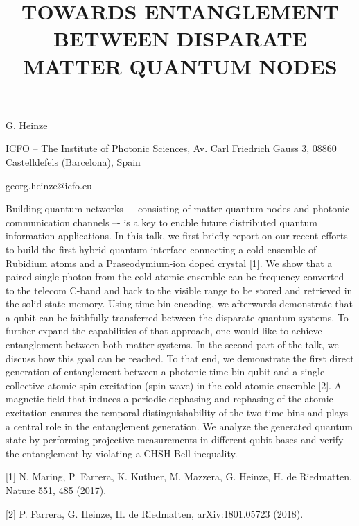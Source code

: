 \title{TOWARDS ENTANGLEMENT BETWEEN DISPARATE MATTER QUANTUM NODES}

\underline{G. Heinze} 

{\normalsize{\vspace{-4mm}
ICFO -- The Institute of Photonic Sciences, Av. Carl Friedrich Gauss 3, 08860 Castelldefels (Barcelona), Spain



\email georg.heinze@icfo.eu}}

Building quantum networks –- consisting of matter quantum nodes and photonic communication channels –- is a key to enable future distributed quantum information applications.
In this talk, we first briefly report on our recent efforts to build the first hybrid quantum interface connecting a cold ensemble of Rubidium atoms and a Praseodymium-ion doped crystal [1]. We show that a paired single photon from the cold atomic ensemble can be frequency converted to the telecom C-band and back to the visible range to be stored and retrieved in the solid-state memory. Using time-bin encoding, we afterwards demonstrate that a qubit can be faithfully transferred between the disparate quantum systems.
To further expand the capabilities of that approach, one would like to achieve entanglement between both matter systems. In the second part of the talk, we discuss how this goal can be reached. To that end, we demonstrate the first direct generation of entanglement between a photonic time-bin qubit and a single collective atomic spin excitation (spin wave) in the cold atomic ensemble [2]. A magnetic field that induces a periodic dephasing and rephasing of the atomic excitation ensures the temporal distinguishability of the two time bins and plays a central role in the entanglement generation. We analyze the generated quantum state by performing projective measurements in different qubit bases and verify the entanglement by violating a CHSH Bell inequality.

{\normalsize
[1] N. Maring, P. Farrera, K. Kutluer, M. Mazzera, G. Heinze, H. de Riedmatten, Nature 551, 485 (2017).
\vsp

[2] P. Farrera, G. Heinze, H. de Riedmatten, arXiv:1801.05723 (2018).
}

\vspace{\baselineskip}
